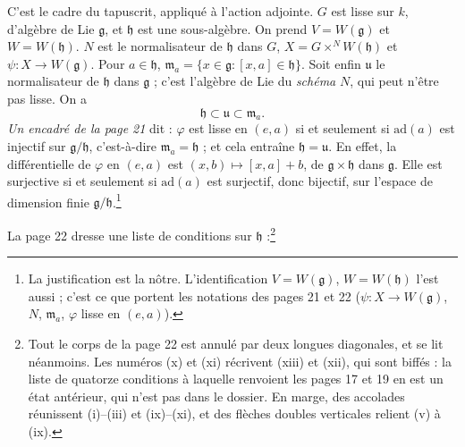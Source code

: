 \documentclass[11pt,a4paper]{article}
\begin{document}
C'est le cadre du tapuscrit, appliqué à l'action adjointe. $G$ est lisse sur
$k$, d'algèbre de Lie $\mathfrak{g}$, et $\mathfrak{h}$ est une sous-algèbre.
On prend $V = W(\mathfrak{g})$ et $W = W(\mathfrak{h})$. $N$ est le
normalisateur de $\mathfrak{h}$ dans $G$, $X = G \times^{N} W(\mathfrak{h})$ et
$\psi : X \to W(\mathfrak{g})$. Pour $a \in \mathfrak{h}$,
$\mathfrak{m}_{a} = \{ x \in \mathfrak{g} : [x, a] \in \mathfrak{h} \}$. Soit
enfin $\mathfrak{u}$ le normalisateur de $\mathfrak{h}$ dans $\mathfrak{g}$ ;
c'est l'algèbre de Lie du \emph{schéma} $N$, qui peut n'être pas lisse. On a
\[
  \mathfrak{h} \subset \mathfrak{u} \subset \mathfrak{m}_{a} .
\]
\emph{Un encadré de la page 21} dit : $\varphi$ est lisse en $(e, a)$ si et
seulement si $\mathrm{ad}(a)$ est injectif sur $\mathfrak{g}/\mathfrak{h}$,
c'est-à-dire $\mathfrak{m}_{a} = \mathfrak{h}$ ; et cela entraîne
$\mathfrak{h} = \mathfrak{u}$. En effet, la différentielle de $\varphi$ en
$(e, a)$ est $(x, b) \mapsto [x, a] + b$, de
$\mathfrak{g} \times \mathfrak{h}$ dans $\mathfrak{g}$. Elle est surjective si
et seulement si $\mathrm{ad}(a)$ est surjectif, donc bijectif, sur l'espace de
dimension finie $\mathfrak{g}/\mathfrak{h}$.\footnote{La justification est la
nôtre. L'identification $V = W(\mathfrak{g})$, $W = W(\mathfrak{h})$ l'est
aussi ; c'est ce que portent les notations des pages 21 et 22 ($\psi : X \to
W(\mathfrak{g})$, $N$, $\mathfrak{m}_{a}$, $\varphi$ lisse en $(e, a)$).}

La page 22 dresse une liste de conditions sur
$\mathfrak{h}$ :\footnote{Tout le corps de la page 22 est annulé par deux
longues diagonales, et se lit néanmoins. Les numéros (x) et (xi) récrivent
(xiii) et (xii), qui sont biffés : la liste de quatorze conditions à laquelle
renvoient les pages 17 et 19 en est un état antérieur, qui n'est pas dans le
dossier. En marge, des accolades réunissent (i)--(iii) et (ix)--(xi), et des
flèches doubles verticales relient (v) à (ix).}
\end{document}
